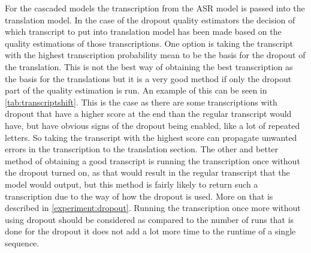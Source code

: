 For the cascaded models the transcription from the ASR model is passed into the translation model. 
In the case of the dropout quality estimators the decision of which transcript to put into translation model has been made based on the quality estimations of those transcriptions.
One option is taking the transcript with the highest transcription probability mean to be the basis for the dropout of the translation. 
This is not the best way of obtaining the best transcription as the basis for the translations but it is a very good method if only the dropout part of the quality estimation is run. 
An example of this can be seen in \autoref{tab:transcriptshift}.
This is the case as there are some transcriptions with dropout that have a higher score at the end than the regular transcript would have, but have obvious signs of the dropout being enabled, like a lot of repeated letters.
So taking the transcript with the highest score can propagate unwanted errors in the transcription to the translation section.
The other and better method of obtaining a good transcript is running the transcription once without the dropout turned on, as that would result in the regular transcript that the model would output, but this method is fairly likely to return such a transcription due to the way of how the dropout is used. More on that is described in \autoref{experiment:dropout}.
Running the transcription once more without using dropout should be considered as compared to the number of runs that is done for the dropout it does not add a lot more time to the runtime of a single sequence.
